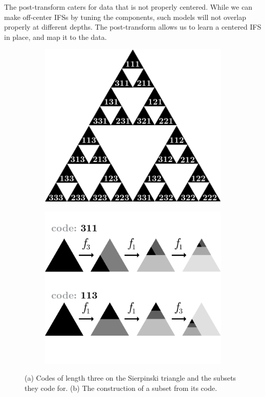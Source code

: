 \documentclass[reprint,amsmath,amssymb,aps,prl]{revtex4-1}
\begin{document}
The post-transform caters for data that is not properly centered. While we can make off-center IFSs by tuning the components, such models will not overlap properly at different depths. The post-transform allows us to learn a centered IFS in place, and map it to the data.


\begin{figure}[tb]
  \centering
  \begin{subfigure}[b]{0.47\linewidth}
    \includegraphics[width=\textwidth]{../img/sierpinski-codes.pdf}
    \caption{}
    \label{fig:sierpinski-codes}
  \end{subfigure}  
  \hspace{0.015\textwidth}
  \begin{subfigure}[b]{0.47\linewidth}
    \includegraphics[width=\textwidth]{../img/code-construction.pdf}
    \caption{}
    \label{fig:code-construction}
  \end{subfigure}

  \caption{\small (a) Codes of length three on the Sierpinski triangle and the subsets they code for. (b) The construction of a subset from its code.}
  \label{figure:codes}
\end{figure}
\end{document}
